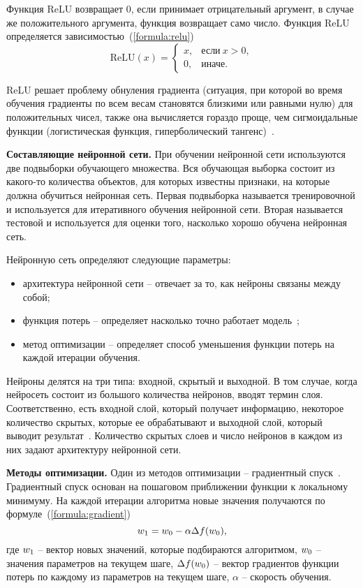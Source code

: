 Функция ReLU возвращает 0, если принимает отрицательный аргумент, в случае же положительного аргумента, функция возвращает само число. 
Функция ReLU определяется зависимостью~(\ref{formula:relu})
\begin{equation}\label{formula:relu}
\mathrm{ReLU}(x)=\begin{cases}
x, & \text{если}\ x>0, \\
0, & \text{иначе}.
\end{cases}
\end{equation} 

ReLU решает проблему обнуления градиента (ситуация, при которой во время обучения градиенты по всем весам становятся близкими или равными нулю) для положительных чисел, также она вычисляется гораздо проще, чем сигмоидальные функции (логистическая функция, гиперболический тангенс)~\cite{activation_function}.

\textbf{Составляющие нейронной сети.}
При обучении нейронной сети используются две подвыборки обучающего множества.
Вся обучающая выборка состоит из какого-то количества объектов, для которых известны признаки, на которые должна обучиться нейронная сеть. 
Первая подвыборка называется тренировочной и используется для итеративного обучения нейронной сети. 
Вторая называется тестовой и используется для оценки того, насколько хорошо обучена нейронная сеть.

Нейронную сеть определяют следующие параметры:
\begin{itemize}
	\item архитектура нейронной сети -- отвечает за то, как нейроны связаны между собой;
	\item функция потерь -- определяет насколько точно работает модель~\cite{neuro_base};
	\item метод оптимизации -- определяет способ уменьшения функции потерь на каждой итерации обучения.
\end{itemize}

Нейроны делятся на три типа: входной, скрытый и выходной. 
В том случае, когда нейросеть состоит из большого количества нейронов, вводят термин слоя. 
Соответственно, есть входной слой, который получает информацию, некоторое количество скрытых, которые ее обрабатывают и выходной слой, который выводит результат~\cite{neuro_architecture}. 
Количество скрытых слоев и число нейронов в каждом из них задают архитектуру нейронной сети.

\textbf{Методы оптимизации.}
Один из методов оптимизации -- градиентный спуск~\cite{gradient}. 
Градиентный спуск основан на пошаговом приближении функции к локальному минимуму. 
На каждой итерации алгоритма новые значения получаются по формуле~(\ref{formula:gradient})
\begin{equation}\label{formula:gradient}
w_{\rm{1}} = w_{\rm{0}} - \alpha\Delta f(w_{\rm{0}}),
\end{equation}
где $w_{\rm{1}}$ -- вектор новых значений, которые подбираются алгоритмом, $w_{\rm{0}}$ -- значения параметров на текущем шаге, $\Delta f(w_{\rm{0}})$ -- вектор градиентов функции потерь по каждому из параметров на текущем шаге, $\alpha$ -- скорость обучения. 

